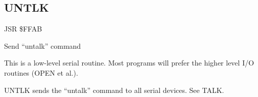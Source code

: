 
\newpage
\subsection{UNTLK}
\label{KERNAL Jump Table!UNTLK}
\begin{description}[leftmargin=2cm,style=nextline]
    \item [Address:] JSR \$FFAB
    \item [Description:] Send ``untalk'' command
    \item [Remarks:]
        This is a low-level serial routine. Most programs will prefer the higher level I/O routines (OPEN et al.).

        UNTLK sends the ``untalk'' command to all serial devices. See TALK.
    \item [Example:]
\end{description}



\newpage
